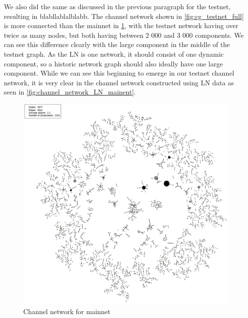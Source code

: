 We also did the same as discussed in the previous paragraph for the testnet, resulting in blabllablalblabb.
The channel network shown in \cref{fig:cg_testnet_full} is more connected than the mainnet in \cref{fig:cg_mainnet_full}, with the testnet network having over twice as many nodes, but both having between 2 000 and 3 000 components. We can see this difference clearly with the large component in the middle of the testnet graph. As the LN is one network, it should consist of one dynamic component, so a historic network graph should also ideally have one large component. While we can see this beginning to emerge in our testnet channel network, it is very clear in the channel network constructed using LN data as seen in \cref{fig:channel_network_LN_mainent}.
\\

\begin{figure}[ht]
    \centering
    \includegraphics[width=13cm]{figures/graphs/cg_bc_mainnet_full.png}
    \caption{Channel network for mainnet}
    \label{fig:cg_mainnet_full}
\end{figure}


